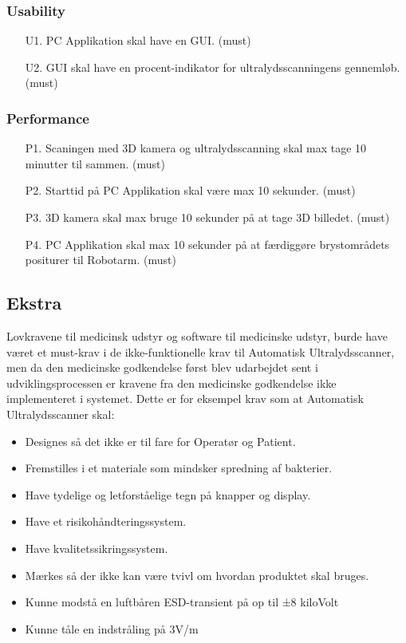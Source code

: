 \subsubsection{Usability}
\begin{itemize}
    \item [U1.] PC Applikation skal have en GUI. (must)
     \item[U2.] GUI skal have en procent-indikator for ultralydsscanningens gennemløb. (must)
\end{itemize}

\subsubsection{Performance}
\begin{itemize}
    \item[P1.] Scaningen med 3D kamera og ultralydsscanning skal max tage 10 minutter til sammen. (must) 
    \item[P2.] Starttid på PC Applikation skal være max 10 sekunder. (must)
    \item[P3.] 3D kamera skal max bruge 10 sekunder på at tage 3D billedet. (must)
    \item[P4.] PC Applikation skal max 10 sekunder på at færdiggøre brystområdets positurer til Robotarm. (must)
\end{itemize}

\subsection{Ekstra}
Lovkravene til medicinsk udstyr og software til medicinske udstyr, burde have været et must-krav i de ikke-funktionelle krav til Automatisk Ultralydsscanner, men da den medicinske godkendelse først blev udarbejdet sent i udviklingsprocessen er kravene fra den medicinske godkendelse ikke implementeret i systemet. Dette er for eksempel krav som at Automatisk Ultralydsscanner skal: 

\begin{itemize}
\item Designes så det ikke er til fare for Operatør og Patient. 
\item Fremstilles i et materiale som mindsker spredning af bakterier. 
\item Have tydelige og letforståelige tegn på knapper og display.
\item Have et risikohåndteringssystem.
\item Have kvalitetssikringssystem. 
\item Mærkes så der ikke kan være tvivl om hvordan produktet skal bruges.
\item Kunne modstå en luftbåren ESD-transient på op til ±8 kiloVolt
\item Kunne tåle en indstråling på 3V/m
\end{itemize}